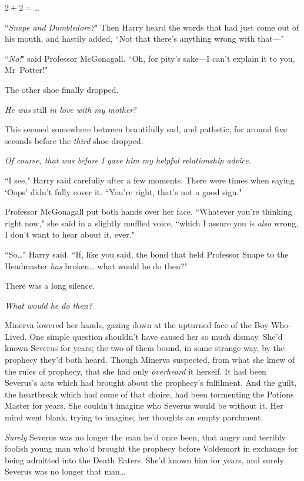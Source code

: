 $2 + 2 = ${\ldots}

``\emph{Snape and Dumbledore?}" Then Harry heard the words that had just come out of his mouth, and hastily added, ``Not that there's anything wrong with that—"

``\emph{No!}" said Professor McGonagall. ``Oh, for pity's sake—I can't explain it to you, Mr~Potter!"

The other shoe finally dropped.

\emph{He was} still \emph{in love with my mother}?

This seemed somewhere between beautifully sad, and pathetic, for around five seconds before the \emph{third} shoe dropped.

\emph{Of course, that was before I gave him my helpful relationship advice.}

``I see," Harry said carefully after a few moments. There were times when saying `Oops' didn't fully cover it. ``You're right, that's not a good sign."

Professor McGonagall put both hands over her face. ``Whatever you're thinking right now," she said in a slightly muffled voice, ``which I assure you is \emph{also} wrong, I don't want to hear about it, ever."

``So{\ldots}" Harry said. ``If, like you said, the bond that held Professor Snape to the Headmaster \emph{has} broken{\ldots} what would he do then?"

There was a long silence.

\later

\emph{What would he do then?}

Minerva lowered her hands, gazing down at the upturned face of the Boy-Who-Lived. One simple question shouldn't have caused her so much dismay. She'd known Severus for years; the two of them bound, in some strange way, by the prophecy they'd both heard. Though Minerva suspected, from what she knew of the rules of prophecy, that she had only \emph{overheard} it herself. It had been Severus's acts which had brought about the prophecy's fulfilment. And the guilt, the heartbreak which had come of that choice, had been tormenting the Potions Master for years. She couldn't imagine who Severus would be without it. Her mind went blank, trying to imagine; her thoughts an empty parchment.

\emph{Surely} Severus was no longer the man he'd once been, that angry and terribly foolish young man who'd brought the prophecy before Voldemort in exchange for being admitted into the Death Eaters. She'd known him for years, and surely Severus was no longer that man{\ldots}


